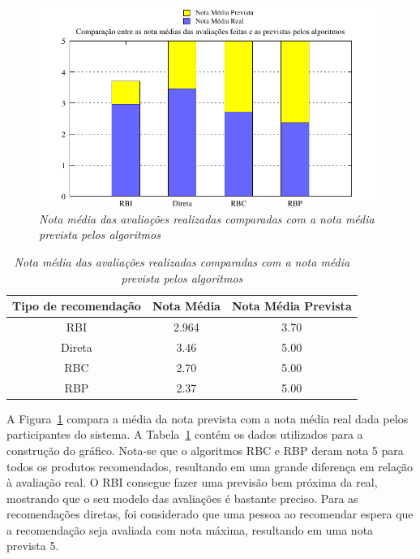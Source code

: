 \begin{figure}
    \centering
    \includegraphics[width=\textwidth]{imagens/grafico_media_prevista}
    \caption{\it Nota média das avaliações realizadas comparadas com a nota média prevista pelos algoritmos}
    \label{fig:media_prevista}
\end{figure}
\begin{table}
\centering
\begin{tabular}{c c c}
    \hline
    \hline
    \textbf{Tipo de recomendação} & \textbf{Nota Média}& \textbf{Nota Média Prevista} \\
    \hline 
RBI & 2.964 & 3.70 \\

\hline 
Direta & 3.46 & 5.00 \\
\hline 
RBC & 2.70 & 5.00 \\
\hline 
RBP & 2.37 & 5.00 \\
\hline        
\end{tabular}
\caption{\it Nota média das avaliações realizadas comparadas com a nota média prevista pelos algoritmos}
\label{table:media_prevista}
\end{table}

A Figura~\ref{fig:media_prevista} compara a média da nota prevista com a nota média real dada pelos participantes do sistema. A Tabela~\ref{table:media_prevista} contém os dados utilizados para a construção do gráfico. Nota-se que o algoritmos RBC e RBP deram nota 5 para todos os produtos recomendados, resultando em uma grande diferença em relação à avaliação real. O RBI consegue fazer uma previsão bem próxima da real, mostrando que o seu modelo das avaliações é bastante preciso. Para as recomendações diretas, foi considerado que uma pessoa ao recomendar espera que a recomendação seja avaliada com nota máxima, resultando em uma nota prevista 5.

